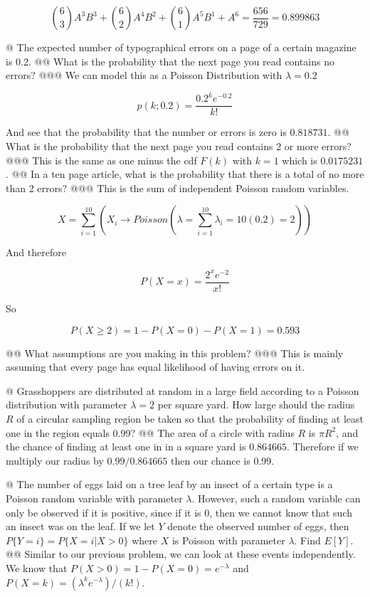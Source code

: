 \documentclass[10pt]{article}
\begin{document}
\begin{easylist}[enumerate]
    \[ \binom{6}{3}A^3B^3 + \binom{6}{2}A^4B^2 + \binom{6}{1} A^5B^1 + A^6 = \frac{656}{729} = \boxed{0.899863} \]

    @ The expected number of typographical errors on a page of a certain magazine is 0.2.
    @@  What is the probability that the next page you read contains no errors?
    @@@ We can model this as a Poisson Distribution with $\lambda = 0.2$

    \[
        p(k;0.2) = \frac{0.2^k e^{-0.2}}{k!}
    \]

    And see that the probability that the number or errors is zero is $\boxed{0.818731}$.
    @@ What is the probability that the next page you read contains 2 or more errors?
    @@@ This is the same as one minus the cdf $F(k)$ with $k=1$ which is $\boxed{0.0175231}$.
    @@ In a ten page article, what is the probability that there is a total of no more than 2 errors?
    @@@ This is the sum of independent Poisson random variables.

    \[ X = \sum_{i=1}^{10} \left( X_i \to Poisson\left(\lambda = \sum_{i=1}^{10} \lambda_i = 10(0.2) = 2\right)\right) \]

    And therefore

    \[ P(X=x) = \frac{2^x e^{-2}}{x!} \]

    So

    \[
        P(X \ge 2) = 1 - P(X=0) - P(X=1) = \boxed{0.593}
    \]

    @@ What assumptions are you making in this problem?
    @@@ This is mainly assuming that every page has equal likelihood of having errors on it.

    @ Grasshoppers are distributed at random in a large field according to a Poisson distribution with parameter
    $\lambda = 2$ per square yard. How large should the radius $R$ of a circular sampling region be taken so that the
    probability of finding at least one in the region equals 0.99?
    @@ The area of a circle with radius $R$ is $\pi R^2$, and the chance of finding at least one in in a square yard is
    $\boxed{0.864665}$. Therefore if we multiply our radius by $\boxed{0.99/0.864665}$ then our chance is 0.99.

    @ The number of eggs laid on a tree leaf by an insect of a certain type is a Poisson random variable with parameter
    $\lambda$. However, such a random variable can only be observed if it is positive, since if it is 0, then we cannot
    know that such an insect was on the leaf. If we let $Y$ denote the observed number of eggs, then $P\{Y = i\} = P\{X
    = i |X > 0\}$ where $X$ is Poisson with parameter $\lambda$. Find $E[Y]$.
    @@ Similar to our previous problem, we can look at these events independently. We know that $P(X > 0)=1-P(X =
    0)=e^{-\lambda}$ and $P(X=k) = (\lambda^k e^{-\lambda})/(k!)$.


\end{easylist}
\end{document}
